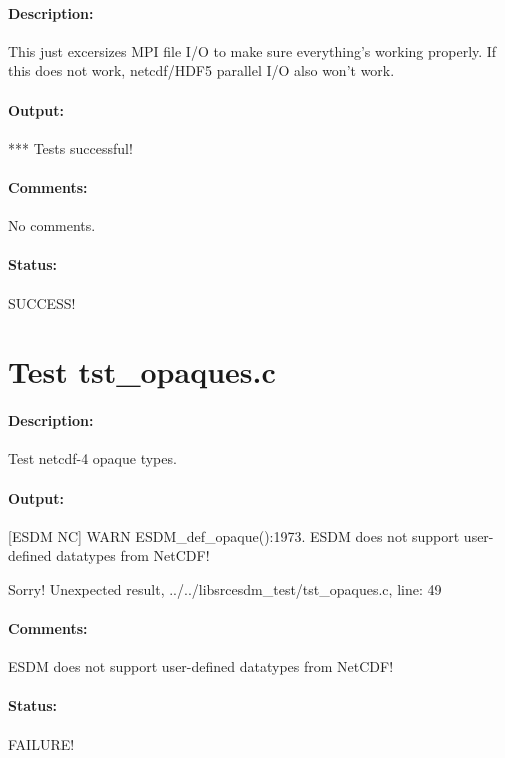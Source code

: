 \paragraph{Description:} This just excersizes MPI file I/O to make sure everything's working properly. If this does not work, netcdf/HDF5 parallel I/O also won't work.

\paragraph{Output:} *** Tests successful!

\paragraph{Comments:} No comments.

\paragraph{Status:} SUCCESS!

\section{Test tst\_opaques.c}

\paragraph{Description:} Test netcdf-4 opaque types.

\paragraph{Output:} [ESDM NC] WARN ESDM\_def\_opaque():1973. ESDM does not support user-defined datatypes from NetCDF!

Sorry! Unexpected result, ../../libsrcesdm\_test/tst\_opaques.c, line: 49

\paragraph{Comments:} ESDM does not support user-defined datatypes from NetCDF!

\paragraph{Status:} FAILURE!

\section{{\color{blue}{FIX ME! Test tst\_parallel.c}}}

